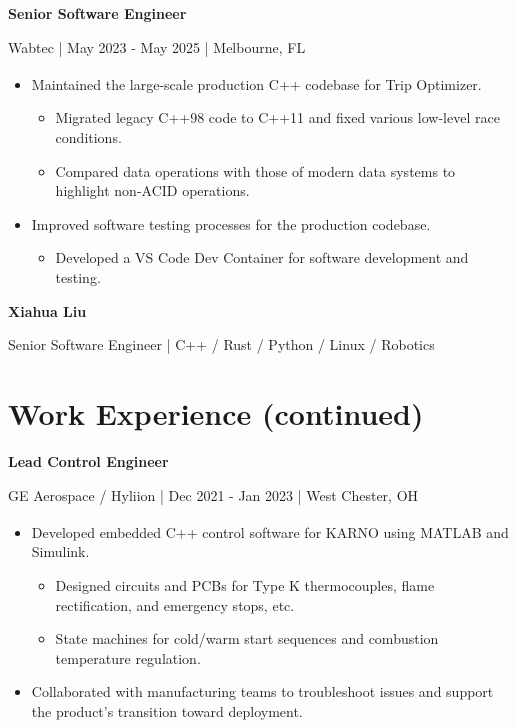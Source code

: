 \documentclass[11pt,a4paper]{article}
\newcommand{\resumetitle}{Senior Software Engineer | C++ / Rust / Python / Linux / Robotics}
\newcommand{\resumejob}[4]{%
  \par\addvspace{7pt}%
  \textbf{#1}\par\nopagebreak
  #2 | #3 | #4\par\nopagebreak
}
\begin{document}
\resumejob{Senior Software Engineer}{Wabtec}{May 2023 - May 2025}{Melbourne, FL}
\begin{itemize}
  \item Maintained the large-scale production C++ codebase for Trip Optimizer\textsuperscript{\textregistered}.
  \begin{itemize}
    \item Migrated legacy C++98 code to C++11 and fixed various low-level race conditions.
    \item Compared data operations with those of modern data systems to highlight non-ACID operations.
  \end{itemize}
  \item Improved software testing processes for the production codebase.
  \begin{itemize}
    \item Developed a VS Code Dev Container for software development and testing.
  \end{itemize}
\end{itemize}

\newpage
{\large\bfseries Xiahua Liu}\par
\resumetitle\par
\section*{Work Experience (continued)}

\resumejob{Lead Control Engineer}{GE Aerospace / Hyliion}{Dec 2021 - Jan 2023}{West Chester, OH}
\begin{itemize}
  \item Developed embedded C++ control software for KARNO\textsuperscript{\textregistered} using MATLAB and Simulink.
  \begin{itemize}
    \item Designed circuits and PCBs for Type K thermocouples, flame rectification, and emergency stops, etc.
    \item State machines for cold/warm start sequences and combustion temperature regulation.
  \end{itemize}
  \item Collaborated with manufacturing teams to troubleshoot issues and support the product's transition toward deployment.
\end{itemize}
\end{document}
